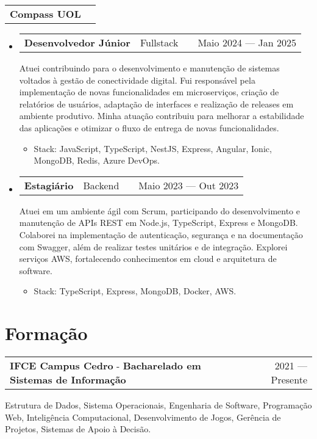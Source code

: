 \documentclass[a4paper,12pt]{article}
\makeatletter
\newenvironment{joblong}[2]{
  \begin{tabularx}{\linewidth}{@{}l X@{}}
    \textbf{#1} & \if\relax\detokenize{#2}\relax\else #2\fi \\
  \end{tabularx}
  \begin{itemize}[leftmargin=1.5em,label={},itemsep=5pt,topsep=0pt]
}{
  \end{itemize}
}
\newenvironment{role}[3]{
  \item
  \begin{tabularx}{\linewidth}{@{}l X r@{}}
    {\small\textbf{#1}}\ \ {\footnotesize\if\relax\detokenize{#3}\relax\else #3\fi} & \hfill & #2 \\
  \end{tabularx}
    }
    {
    }
\newenvironment{education}[3]
    {
    \begin{tabularx}{\linewidth}{@{}l X r@{}}
    \textbf{#1} - \textbf{#2} & \hfill &  #3 \\[3.75pt]
    \end{tabularx}
    }
    {
    }
\makeatother
\begin{document}
\begin{joblong}{Compass UOL}{}
  \begin{role}{Desenvolvedor Júnior}{Maio 2024 — Jan 2025}{Fullstack}
    Atuei contribuindo para o desenvolvimento e manutenção de sistemas voltados à gestão de conectividade digital. Fui responsável pela implementação de novas funcionalidades em microserviços, criação de relatórios de usuários, adaptação de interfaces e realização de releases em ambiente produtivo. Minha atuação contribuiu para melhorar a estabilidade das aplicações e otimizar o fluxo de entrega de novas funcionalidades.
    \begin{itemize}[nosep,after=\strut, leftmargin=0em, itemsep=3pt,label={}]
        \item Stack: JavaScript, TypeScript, NestJS, Express, Angular, Ionic, MongoDB, Redis, Azure DevOps.
    \end{itemize}
  \end{role}

  \begin{role}{Estagiário}{Maio 2023 — Out 2023}{Backend}
    Atuei em um ambiente ágil com Scrum, participando do desenvolvimento e manutenção de APIs REST em Node.js, TypeScript, Express e MongoDB. Colaborei na implementação de autenticação, segurança e na documentação com Swagger, além de realizar testes unitários e de integração. Explorei serviços AWS, fortalecendo conhecimentos em cloud e arquitetura de software.
    \begin{itemize}[nosep,after=\strut, leftmargin=0em, itemsep=3pt,label={}]
        \item Stack: TypeScript, Express, MongoDB, Docker, AWS.
    \end{itemize}
  \end{role}
\end{joblong}
  

\section{Formação}
    
\begin{education}{IFCE Campus Cedro}{Bacharelado em Sistemas de Informação}{2021 — Presente}
Estrutura de Dados, Sistema Operacionais, Engenharia de Software, Programação Web, Inteligência Computacional, Desenvolvimento de Jogos, Gerência de Projetos, Sistemas de Apoio à Decisão.
\end{education}
\end{document}
